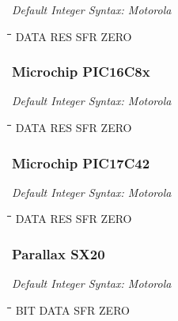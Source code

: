 {\em Default Integer Syntax: Motorola}

{\tt\begin{tabbing}
\hspace{3cm}\=\hspace{3cm}\=\hspace{3cm}\=\hspace{3cm}\=\kill
DATA       \> RES         \> SFR         \> ZERO \\
\end{tabbing}}

\subsubsection{Microchip PIC16C8x}

{\em Default Integer Syntax: Motorola}

{\tt\begin{tabbing}
\hspace{3cm}\=\hspace{3cm}\=\hspace{3cm}\=\hspace{3cm}\=\kill
DATA       \> RES         \> SFR         \> ZERO \\
\end{tabbing}}

\subsubsection{Microchip PIC17C42}

{\em Default Integer Syntax: Motorola}

{\tt\begin{tabbing}
\hspace{3cm}\=\hspace{3cm}\=\hspace{3cm}\=\hspace{3cm}\=\kill
DATA       \> RES         \> SFR         \> ZERO \\
\end{tabbing}}

\subsubsection{Parallax SX20}

{\em Default Integer Syntax: Motorola}

{\tt\begin{tabbing}
\hspace{3cm}\=\hspace{3cm}\=\hspace{3cm}\=\hspace{3cm}\=\kill
BIT        \> DATA        \> SFR         \> ZERO \\
\end{tabbing}}

